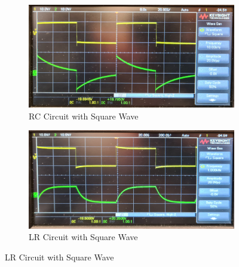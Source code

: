\documentclass[a4paper,12pt]{article}
\begin{document}
\begin{figure}[H]
  \centering
  \begin{subfigure}{.5\textwidth}
    \centering
    \includegraphics[width=.9\linewidth]{../data/20211116_104029-mod.jpg}
    \caption{RC Circuit with Square Wave}
  \end{subfigure}%
  \begin{subfigure}{.5\textwidth}
    \centering
    \includegraphics[width=.9\linewidth]{../data/20211116_104711-mod.jpg}
    \caption{LR Circuit with Square Wave}
  \end{subfigure}
\end{figure}
\end{document}

